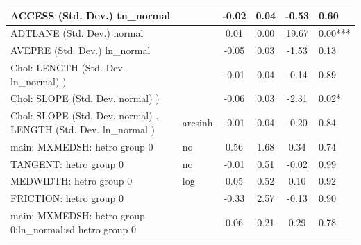 \begin{table}
\begin{center}
\begin{tabular}{|l|l|c|c|c|l|}
			\hline
			ACCESS (Std. Dev.) tn_normal &  & -0.02 & 0.04 & -0.53 & 0.60 \\
			\hline
			ADTLANE (Std. Dev.) normal &  & 0.01 & 0.00 & 19.67 & 0.00*** \\
			\hline
			AVEPRE (Std. Dev.) ln_normal &  & -0.05 & 0.03 & -1.53 & 0.13 \\
			\hline
			 Chol: LENGTH (Std. Dev. ln_normal) ) &  & -0.01 & 0.04 & -0.14 & 0.89 \\
			\hline
			 Chol: SLOPE (Std. Dev. normal) ) &  & -0.06 & 0.03 & -2.31 & 0.02* \\
			\hline
			 Chol: SLOPE (Std. Dev. normal) . LENGTH (Std. Dev.   ln_normal ) & arcsinh & -0.01 & 0.04 & -0.20 & 0.84 \\
			\hline
			main: MXMEDSH: hetro group 0 & no & 0.56 & 1.68 & 0.34 & 0.74 \\
			\hline
			TANGENT: hetro group 0 & no & -0.01 & 0.51 & -0.02 & 0.99 \\
			\hline
			MEDWIDTH: hetro group 0 & log & 0.05 & 0.52 & 0.10 & 0.92 \\
			\hline
			FRICTION: hetro group 0 &  & -0.33 & 2.57 & -0.13 & 0.90 \\
			\hline
			main: MXMEDSH: hetro group 0:ln_normal:sd  hetro group 0 &  & 0.06 & 0.21 & 0.29 & 0.78 \\
			\hline
		\end{tabular}
	\end{center}
\end{table}